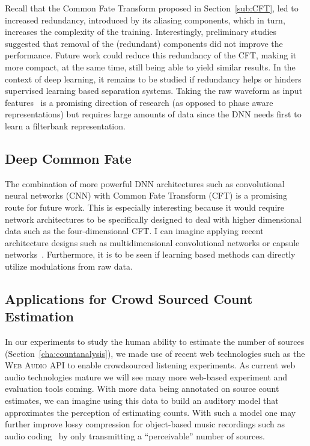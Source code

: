 Recall that the Common Fate Transform proposed in Section~\ref{sub:CFT}, led to increased redundancy, introduced by its aliasing components, which in turn, increases the complexity of the training.
Interestingly, preliminary studies suggested that removal of the (redundant) components did not improve the performance.
Future work could reduce this redundancy of the CFT, making it more compact, at the same time, still being able to yield similar results.
In the context of deep learning, it remains to be studied if redundancy helps or hinders supervised learning based separation systems.
Taking the raw waveform as input features~\cite{Dieleman14, oord16} is a promising direction of research (as opposed to phase aware representations) but requires large amounts of data since the DNN needs first to learn a filterbank representation.

\subsection*{Deep Common Fate}


The combination of more powerful DNN architectures such as convolutional neural networks (CNN) with Common Fate Transform (CFT) is a promising route for future work. 
This is especially interesting because it would require network architectures to be specifically designed to deal with higher dimensional data such as the four-dimensional CFT. I can imagine applying recent architecture designs such as multidimensional convolutional networks or capsule networks~\cite{sabour17}. 
Furthermore, it is to be seen if learning based methods can directly utilize modulations from raw data.

\subsection*{Applications for Crowd Sourced Count Estimation}

In our experiments to study the human ability to estimate the number of sources (Section~\ref{cha:countanalysis}), we made use of recent web technologies such as the \textsc{Web Audio API} to enable crowdsourced listening experiments. As current web audio technologies mature we will see many more web-based experiment and evaluation tools coming.
With more data being annotated on source count estimates, we can imagine using this data to build an auditory model that approximates the perception of estimating counts.
With such a model one may further improve lossy compression for object-based music recordings such as audio coding~\cite{herre12} by only transmitting a ``perceivable'' number of sources.


